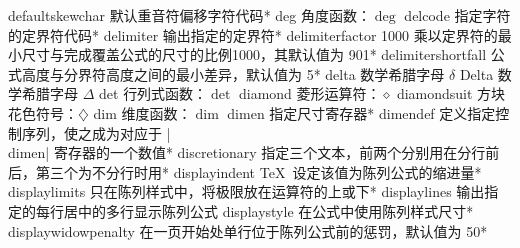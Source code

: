 \capcs defaultskewchar {默认重音符偏移字符代码}*{}
\capcs deg {角度函数：$\deg$}{}{}
\capcs delcode {指定字符的定界符代码}*{}
\capcs delimiter {输出指定的定界符}*{}
\capcs delimiterfactor {1000 乘以定界符的最小尺寸与完成覆盖公式的尺寸的比例1000，其默认值为 901}*{}
\capcs delimitershortfall {公式高度与分界符高度之间的最小差异，默认值为 5\pt}*{}
\capcs delta {数学希腊字母 $\delta$}{}{}
\capcs Delta {数学希腊字母 $\Delta$}{}{}
\capcs det {行列式函数：$\det$}{}{}
\capcs diamond {菱形运算符：$\diamond$}{}{}
\capcs diamondsuit {方块花色符号：$\diamondsuit$}{}{}
\capcs dim {维度函数：$\dim$}{}{}
\capcs dimen {指定尺寸寄存器}*{}
\capcs dimendef {定义指定控制序列，使之成为对应于 |\\dimen| 寄存器的一个数值}*{}
\capcs discretionary {指定三个文本，前两个分别用在分行前后，第三个为不分行时用}*{}
\capcs displayindent {\TeX\ 设定该值为陈列公式的缩进量}*{}
\capcs displaylimits {只在陈列样式中，将极限放在运算符的上或下}*{}
\capcs displaylines {输出指定的每行居中的多行显示陈列公式}{}{}
\capcs displaystyle {在公式中使用陈列样式尺寸}*{}
\capcs displaywidowpenalty {在一页开始处单行位于陈列公式前的惩罚，默认值为 50}*{}
